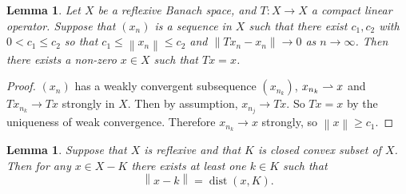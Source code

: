 \documentclass[12pt,a4paper]{report}
\numberwithin{equation}{section}
\theoremstyle{mystyle}
\newtheorem{lemma}[definition]{Lemma}
\newcommand{\norm}[1]{\left\lVert #1 \right\rVert}
\newcommand{\dist}{\operatorname{dist}}
\begin{document}
	\begin{lemma}
		Let $X$ be a reflexive Banach space, and $T:X\to X$ a compact linear operator. Suppose that $(x_n)$ is a sequence in $X$ such that there exist $c_1,c_2$ with $0<c_1\leq c_2$ so that $c_1\leq \norm{x_n}\leq c_2$ and $\norm{Tx_n-x_n}\to 0$ as $n\to\infty$. Then there exists a non-zero $x\in X$ such that $Tx=x$.
	\end{lemma}
	\begin{proof}
		$(x_n)$ has a weakly convergent subsequence $(x_{n_k})$, $x_{n_k}\rightharpoonup x$ and $Tx_{n_k}\to Tx$ strongly in $X$. Then by assumption, $x_{n_j}\to Tx$. So $Tx=x$ by the uniqueness of weak convergence. Therefore $x_{n_k}\to x$ strongly, so $\norm{x}\geq c_1$.
	\end{proof}

	\begin{lemma}
		Suppose that $X$ is reflexive and that $K$ is closed convex subset of $X$. Then for any $x\in X-K$ there exists at least one $k\in K$ such that
		$$
		\norm{x-k}=\dist(x,K).
		$$
	\end{lemma}





















	\appendix
	
	 
\end{document}
